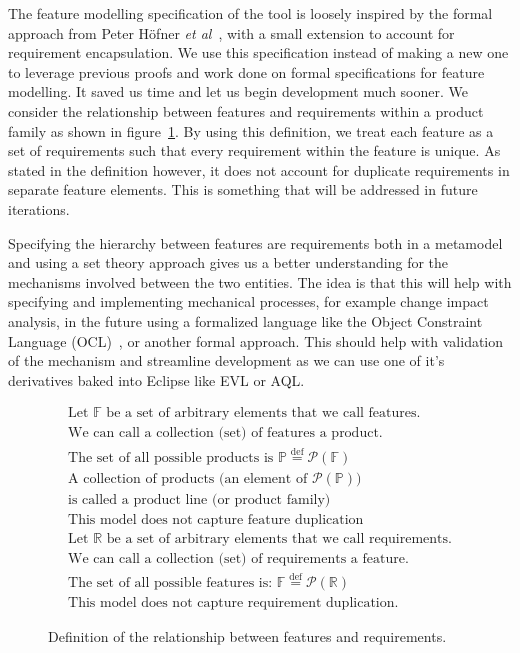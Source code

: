 The feature modelling specification of the tool is loosely inspired by the formal approach from Peter H\"{o}fner \textit{et al}~\cite{hofner2006feature,hofner2011algebra}, with a small extension to account for requirement encapsulation. We use this specification instead of making a new one to leverage previous proofs and work done on formal specifications for feature modelling. It saved us time and let us begin development much sooner. We consider the relationship between features and requirements within a product family as shown in figure~\ref{fig:spec}. By using this definition, we treat each feature as a set of requirements such that every requirement within the feature is unique. As stated in the definition however, it does not account for duplicate requirements in separate feature elements. This is something that will be addressed in future iterations. 

Specifying the hierarchy between features are requirements both in a metamodel and using a set theory approach gives us a better understanding for the mechanisms involved between the two entities. The idea is that this will help with specifying and implementing mechanical processes, for example change impact analysis, in the future using a formalized language like the Object Constraint Language (OCL)~\cite{richters2002ocl, cabot2012object}, or another formal approach. This should help with validation of the mechanism and streamline development as we can use one of it's derivatives baked into Eclipse like \ac{EVL} or \ac{AQL}.

\begin{figure}
\begin{align}
	\text{Let } \mathbb{F} \text{ be a set of arbitrary elements that we call features.}\\
		\text{We can call a collection (set) of features a product.}\\
		\text{The set of all possible products is } \mathbb{P} \overset{\mathrm{def}}{=} \mathcal{P}(\mathbb{F})\\
		\text{A collection of products (an element of } \mathcal{P}(\mathbb{P})\text{)}\\
		\text{is called a product line (or product family)}\\
		\text{This model does not capture feature duplication}\\
		\text{Let } \mathbb{R} \text{ be a set of arbitrary elements that we call requirements.}\\
		\text{We can call a collection (set) of requirements a feature.}\\
		\text{The set of all possible features is: } \mathbb{F} \overset{\mathrm{def}}{=} \mathcal{P}(\mathbb{R})\\
		\text{This model does not capture requirement duplication.}
\end{align}
\caption{Definition of the relationship between features and requirements.}
\label{fig:spec}
\end{figure}

